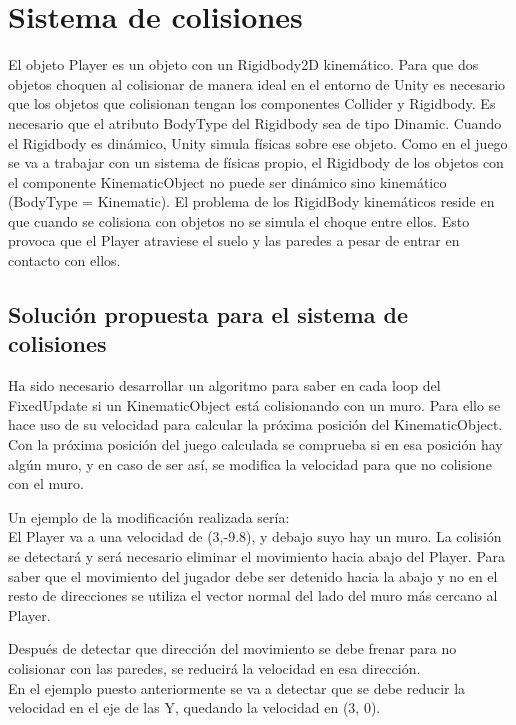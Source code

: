 \section{Sistema de colisiones \cite{ContinuousCollision}\cite{UnderstandingConstraints}}
El objeto Player es un objeto con un Rigidbody2D kinemático. Para que dos objetos choquen al colisionar de manera ideal en el entorno de Unity es necesario que los objetos que colisionan tengan los componentes Collider y Rigidbody. Es necesario que el atributo BodyType del Rigidbody sea de tipo Dinamic. Cuando el Rigidbody es dinámico, Unity simula físicas sobre ese objeto. Como en el juego se va a trabajar con un sistema de físicas propio, el Rigidbody de los objetos con el componente KinematicObject no puede ser dinámico sino kinemático (BodyType = Kinematic). El problema de los RigidBody kinemáticos reside en que cuando se colisiona con objetos no se simula el choque entre ellos. Esto provoca que el Player atraviese el suelo y las paredes a pesar de entrar en contacto con ellos.

\subsection{Solución propuesta para el sistema de colisiones}
Ha sido necesario desarrollar un algoritmo para saber en cada loop del FixedUpdate si un KinematicObject está colisionando con un muro. Para ello se hace uso de su velocidad para calcular la próxima posición del KinematicObject.\\
Con la próxima posición del juego calculada se comprueba si en esa posición hay algún muro, y en caso de ser así, se modifica la velocidad para que no colisione con el muro.

Un ejemplo de la modificación realizada sería:\\
El Player va a una velocidad de (3,-9.8), y debajo suyo hay un muro. La colisión se detectará y será necesario eliminar el movimiento hacia abajo del Player. Para saber que el movimiento del jugador debe ser detenido hacia la abajo y no en el resto de direcciones se utiliza el vector normal del lado del muro más cercano al Player.

Después de detectar que dirección del movimiento se debe frenar para no colisionar con las paredes, se reducirá la velocidad en esa dirección.\\
En el ejemplo puesto anteriormente se va a detectar que se debe reducir la velocidad en el eje de las Y, quedando la velocidad en (3, 0).

